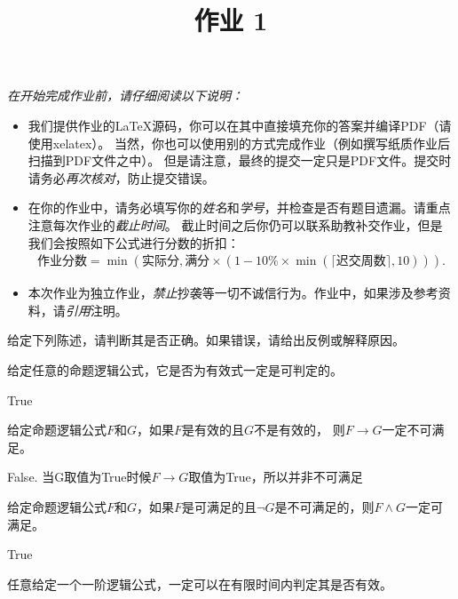 \documentclass[11pt,a4paper]{article}
\title{作业 1}
\begin{document}
\maketitle

\textit{在开始完成作业前，请仔细阅读以下说明：}
\begin{itemize}
    \item 我们提供作业的\LaTeX 源码，你可以在其中直接填充你的答案并编译PDF（请使用xelatex）。
    当然，你也可以使用别的方式完成作业（例如撰写纸质作业后扫描到PDF文件之中）。
    但是请注意，最终的提交一定只是PDF文件。提交时请务必\emph{再次核对}，防止提交错误。
    \item 在你的作业中，请务必填写你的\emph{姓名}和\emph{学号}，并检查是否有题目遗漏。请重点注意每次作业的\emph{截止时间}。
    截止时间之后你仍可以联系助教补交作业，但是我们会按照如下公式进行分数的折扣：
    \begin{align*}
        \text{作业分数} = \min\left(\text{实际分}, \text{满分}\times\left(1 - 10\%\times\min\left(\lceil\text{迟交周数}\rceil, 10\right)\right)\right).
    \end{align*}
    \item 本次作业为独立作业，\emph{禁止}抄袭等一切不诚信行为。作业中，如果涉及参考资料，请\emph{引用}注明。
\end{itemize}



给定下列陈述，请判断其是否正确。如果错误，请给出反例或解释原因。

\subproblem 给定任意的命题逻辑公式，它是否为有效式一定是可判定的。

\begin{solution}
    True
\end{solution}

\subproblem 给定命题逻辑公式$F$和$G$，如果$F$是有效的且$G$不是有效的，
则$F\rightarrow G$一定不可满足。

\begin{solution}
    False. 当G取值为True时候$F\rightarrow G$取值为True，所以并非不可满足
\end{solution}

\subproblem 给定命题逻辑公式$F$和$G$，如果$F$是可满足的且$\neg G$是不可满足的，则$F\wedge G$一定可满足。

\begin{solution}
    True
\end{solution}

\subproblem 任意给定一个一阶逻辑公式，一定可以在有限时间内判定其是否有效。
\end{document}
